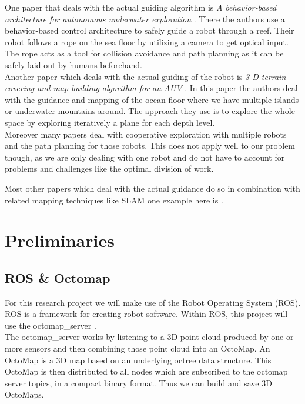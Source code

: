 \documentclass[twoside, 12pt]{article}
\begin{document}
One paper that deals with the actual guiding algorithm is \textit{A behavior-based architecture for autonomous underwater exploration} \cite{rosenblatt2002behavior}. There the authors use a behavior-based control architecture to safely guide a robot through a reef. Their robot follows a rope on the sea floor by utilizing a camera to get optical input. The rope acts as a tool for collision avoidance and path planning as it can be safely laid out by humans beforehand.\\

Another paper which deals with the actual guiding of the robot is \textit{3-D terrain covering and map building algorithm for an AUV} \cite{lee20093}. In this paper the authors deal with the guidance and mapping of the ocean floor where we have multiple islands or underwater mountains around. The approach they use is to explore the whole space by exploring iteratively a plane for each depth level.\\

Moreover many papers deal with cooperative exploration with multiple robots and the path planning for those robots. This does not apply well to our problem though, as we are only dealing with one robot and do not have to account for problems and challenges like the optimal division of work.~\cite{wu2012robust}

Most other papers which deal with the actual guidance do so in combination with related mapping techniques like SLAM one example here is \cite{makarenko2002experiment}.


  
\section{Preliminaries}
\label{sec:preliminaries}

\subsection{ROS \& Octomap}
For this research project we will make use of the Robot Operating System (ROS). ROS is a framework for creating robot software.  Within ROS, this project will use the octomap\_server \cite{hornung13auro}.\\

The octomap\_server works by listening to a 3D point cloud produced by one or more sensors and then combining those point cloud into an OctoMap. An OctoMap is a 3D map based on an underlying octree data structure. This OctoMap is then distributed to all nodes which are subscribed to the octomap server topics, in a compact binary format. Thus we can build and save 3D OctoMaps.\\
\end{document}

